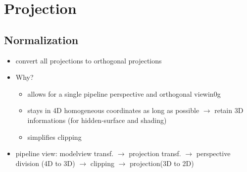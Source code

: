 \documentclass[11pt,a4paper]{article}
\begin{document}
\section{Projection}
\subsection{Normalization}
\begin{itemize}
	\item convert all projections to orthogonal projections
	\item Why?
	\begin{itemize}
		\item allows for a single pipeline perspective and orthogonal viewin0g
		\item stays in 4D homogeneous coordinates as long as possible $\rightarrow$ retain 3D informations (for hidden-surface and shading)
		\item simplifies clipping
	\end{itemize}
	\item pipeline view: modelview transf. $\rightarrow$ projection transf.  $\rightarrow$  perspective division (4D to 3D) $\rightarrow$  clipping  $\rightarrow$ projection(3D to 2D)
\end{itemize}
\end{document}
